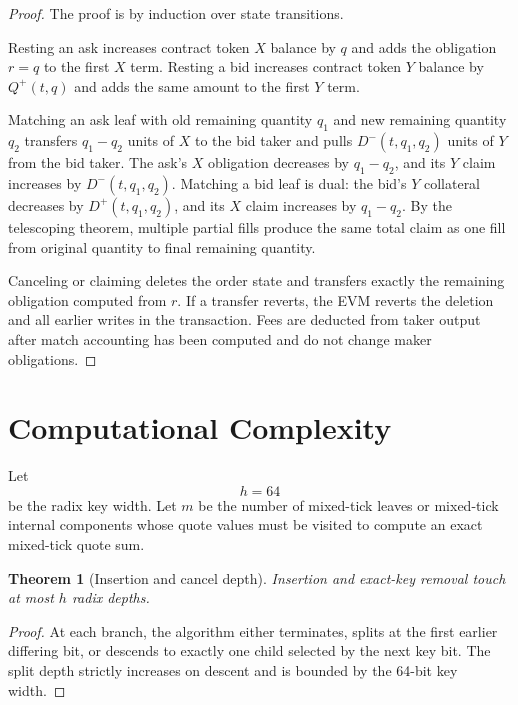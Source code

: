 \documentclass[11pt]{article}
\newtheorem{theorem}{Theorem}
\begin{document}
\begin{proof}
The proof is by induction over state transitions.

Resting an ask increases contract token \(X\) balance by \(q\) and adds
the obligation \(r=q\) to the first \(X\) term.  Resting a bid increases
contract token \(Y\) balance by \(Q^{+}(t,q)\) and adds the same amount
to the first \(Y\) term.

Matching an ask leaf with old remaining quantity \(q_1\) and new
remaining quantity \(q_2\) transfers \(q_1-q_2\) units of \(X\) to the
bid taker and pulls \(D^{-}(t,q_1,q_2)\) units of \(Y\) from the bid
taker.  The ask's \(X\) obligation decreases by \(q_1-q_2\), and its
\(Y\) claim increases by \(D^{-}(t,q_1,q_2)\).  Matching a bid leaf is
dual: the bid's \(Y\) collateral decreases by \(D^{+}(t,q_1,q_2)\), and
its \(X\) claim increases by \(q_1-q_2\).  By the telescoping theorem,
multiple partial fills produce the same total claim as one fill from
original quantity to final remaining quantity.

Canceling or claiming deletes the order state and transfers exactly the
remaining obligation computed from \(r\).  If a transfer reverts, the EVM
reverts the deletion and all earlier writes in the transaction.  Fees are
deducted from taker output after match accounting has been computed and
do not change maker obligations.
\end{proof}

\section{Computational Complexity}

Let
\[
  h=64
\]
be the radix key width.  Let \(m\) be the number of mixed-tick leaves or
mixed-tick internal components whose quote values must be visited to
compute an exact mixed-tick quote sum.

\begin{theorem}[Insertion and cancel depth]
Insertion and exact-key removal touch at most \(h\) radix depths.
\end{theorem}

\begin{proof}
At each branch, the algorithm either terminates, splits at the first
earlier differing bit, or descends to exactly one child selected by the
next key bit.  The split depth strictly increases on descent and is
bounded by the 64-bit key width.
\end{proof}
\end{document}
